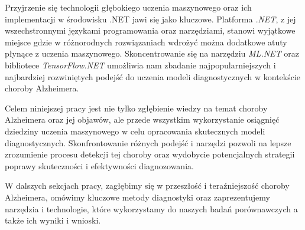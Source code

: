 Przyjrzenie się technologii głębokiego uczenia maszynowego oraz ich implementacji w środowisku .NET jawi się jako kluczowe.
Platforma \emph{.NET}, z jej wszechstronnymi językami programowania oraz narzędziami, stanowi wyjątkowe miejsce gdzie w różnorodnych rozwiązaniach wdrożyć można dodatkowe atuty płynące z uczenia maszynowego.
Skoncentrowanie się na narzędziu \emph{ML.NET} oraz bibliotece \emph{TensorFlow.NET} umożliwia nam zbadanie najpopularniejszych i najbardziej rozwiniętych podejść do uczenia modeli diagnostycznych w kontekście choroby Alzheimera.

Celem niniejszej pracy jest nie tylko zgłębienie wiedzy na temat choroby Alzheimera oraz jej objawów, ale przede wszystkim wykorzystanie osiągnięć dziedziny uczenia maszynowego w celu opracowania skutecznych modeli diagnostycznych.
Skonfrontowanie różnych podejść i narzędzi pozwoli na lepsze zrozumienie procesu detekcji tej choroby oraz wydobycie potencjalnych strategii poprawy skuteczności i efektywności diagnozowania.

W dalszych sekcjach pracy, zagłębimy się w przeszłość i teraźniejszość choroby Alzheimera, omówimy kluczowe metody diagnostyki oraz zaprezentujemy narzędzia i technologie, które wykorzystamy do naszych badań porównawczych a także ich wyniki i wnioski.
